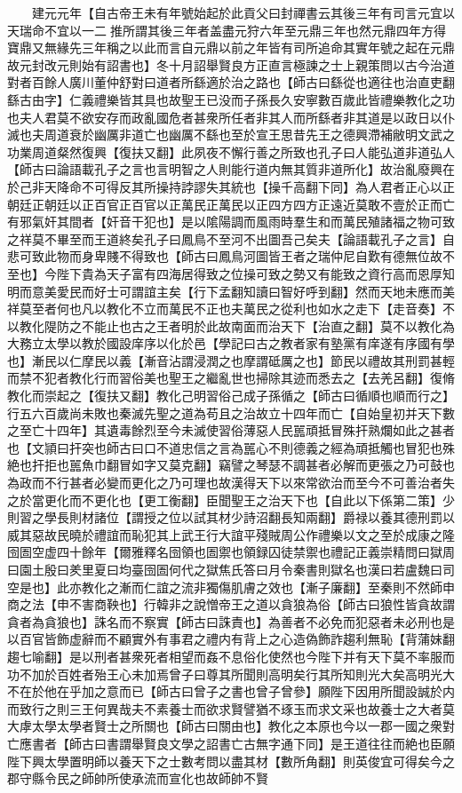 　　建元元年【自古帝王未有年號始起於此貢父曰封禪書云其後三年有司言元宜以天瑞命不宜以一二推所謂其後三年者盖盡元狩六年至元鼎三年也然元鼎四年方得寶鼎又無緣先三年稱之以此而言自元鼎以前之年皆有司所追命其實年號之起在元鼎故元封改元則始有詔書也】冬十月詔舉賢良方正直言極諫之士上親策問以古今治道對者百餘人廣川董仲舒對曰道者所繇適於治之路也【師古曰繇從也適往也治直吏翻繇古由字】仁義禮樂皆其具也故聖王已没而子孫長久安寧數百歲此皆禮樂教化之功也夫人君莫不欲安存而政亂國危者甚衆所任者非其人而所繇者非其道是以政日以仆滅也夫周道衰於幽厲非道亡也幽厲不繇也至於宣王思昔先王之德興滯補敝明文武之功業周道粲然復興【復扶又翻】此夙夜不懈行善之所致也孔子曰人能弘道非道弘人【師古曰論語載孔子之言也言明智之人則能行道内無其質非道所化】故治亂廢興在於己非天降命不可得反其所操持誖謬失其統也【操千高翻下同】為人君者正心以正朝廷正朝廷以正百官正百官以正萬民正萬民以正四方四方正遠近莫敢不壹於正而亡有邪氣奸其間者【奸音干犯也】是以隂陽調而風雨時羣生和而萬民殖諸福之物可致之祥莫不畢至而王道終矣孔子曰鳳鳥不至河不出圖吾己矣夫【論語載孔子之言】自悲可致此物而身卑賤不得致也【師古曰鳳鳥河圖皆王者之瑞仲尼自歎有德無位故不至也】今陛下貴為天子富有四海居得致之位操可致之勢又有能致之資行高而恩厚知明而意美愛民而好士可謂誼主矣【行下孟翻知讀曰智好呼到翻】然而天地未應而美祥莫至者何也凡以教化不立而萬民不正也夫萬民之從利也如水之走下【走音奏】不以教化隄防之不能止也古之王者明於此故南面而治天下【治直之翻】莫不以教化為大務立太學以教於國設庠序以化於邑【學記曰古之教者家有塾黨有庠遂有序國有學也】漸民以仁摩民以義【漸音沾謂浸潤之也摩謂砥厲之也】節民以禮故其刑罰甚輕而禁不犯者教化行而習俗美也聖王之繼亂世也掃除其迹而悉去之【去羌呂翻】復脩教化而崇起之【復扶又翻】教化己明習俗己成子孫循之【師古曰循順也順而行之】行五六百歲尚未敗也秦滅先聖之道為苟且之治故立十四年而亡【自始皇初并天下數之至亡十四年】其遺毒餘烈至今未滅使習俗薄惡人民嚚頑抵冒殊扞熟爛如此之甚者也【文頴曰扞突也師古曰口不道忠信之言為嚚心不則德義之經為頑抵觸也冒犯也殊絶也扞拒也嚚魚巾翻冒如字又莫克翻】竊譬之琴瑟不調甚者必解而更張之乃可鼓也為政而不行甚者必變而更化之乃可理也故漢得天下以來常欲治而至今不可善治者失之於當更化而不更化也【更工衡翻】臣聞聖王之治天下也【自此以下係第二策】少則習之學長則材諸位【謂授之位以試其材少詩沼翻長知兩翻】爵禄以養其德刑罰以威其惡故民曉於禮誼而恥犯其上武王行大誼平殘賊周公作禮樂以文之至於成康之隆囹圄空虚四十餘年【爾雅釋名囹領也圄禦也領録囚徒禁禦也禮記正義崇精問曰獄周曰園土殷曰羑里夏曰均臺囹圄何代之獄焦氏答曰月令秦書則獄名也漢曰若盧魏曰司空是也】此亦教化之漸而仁誼之流非獨傷肌膚之效也【漸子廉翻】至秦則不然師申商之法【申不害商鞅也】行韓非之說憎帝王之道以貪狼為俗【師古曰狼性皆貪故謂貪者為貪狼也】誅名而不察實【師古曰誅責也】為善者不必免而犯惡者未必刑也是以百官皆飾虚辭而不顧實外有事君之禮内有背上之心造偽飾詐趨利無恥【背蒲妹翻趨七喻翻】是以刑者甚衆死者相望而姦不息俗化使然也今陛下并有天下莫不率服而功不加於百姓者殆王心未加焉曾子曰尊其所聞則高明矣行其所知則光大矣高明光大不在於他在乎加之意而已【師古曰曾子之書也曾子曾參】願陛下因用所聞設誠於内而致行之則三王何異哉夫不素養士而欲求賢譬猶不琢玉而求文采也故養士之大者莫大虖太學太學者賢士之所關也【師古曰關由也】教化之本原也今以一郡一國之衆對亡應書者【師古曰書謂舉賢良文學之詔書亡古無字通下同】是王道往往而絶也臣願陛下興太學置明師以養天下之士數考問以盡其材【數所角翻】則英俊宜可得矣今之郡守縣令民之師帥所使承流而宣化也故師帥不賢